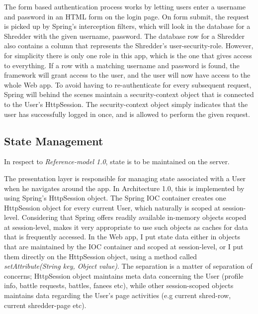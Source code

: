 The form based authentication process works by letting users enter a username and password in an HTML form on the login page. On form submit, the request is picked up by Spring's interception filters, which will look in the database for a Shredder with the given username, password. The database row for a Shredder also contains a column that represents the Shredder's user-security-role. However, for simplicity there is only one role in this app, which is the one that gives access to everything. If a row with a matching username and password is found, the framework will grant access to the user, and the user will now have access to the whole Web app. To avoid having to re-authenticate for every subsequent request, Spring will behind the scenes maintain a security-context object that is connected to the User's HttpSession. The security-context object simply indicates that the user has successfully logged in once, and is allowed to perform the given request. 
		  
\subsection{State Management}
In respect to \textit{Reference-model 1.0}, state is to be maintained on the server. 

The presentation layer is responsible for managing state associated with a User when he navigates around the app. In Architecture 1.0, this is implemented by using Spring's HttpSession object. The Spring IOC container creates one HttpSession object for every current User, which naturally is scoped at session-level. Considering that Spring offers readily available in-memory objects scoped at session-level, makes it very appropriate to use such objects as caches for data that is frequently accessed. In the Web app, I put state data either in objects that are maintained by the IOC container and scoped at session-level, or I put them directly on the HttpSession object, using a method called \textit{setAttribute(String key, Object value)}. The separation is a matter of separation of concerns; HttpSession object maintains meta data concerning the User (profile info, battle requests, battles, fanees etc), while other session-scoped objects maintains data regarding the User's page activities (e.g current shred-row, current shredder-page etc).

